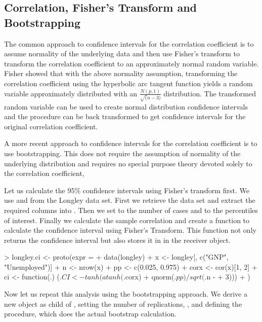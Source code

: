 \documentclass{Z}
\begin{document}
\subsection{Correlation, Fisher's Transform and Bootstrapping}
\label{sec:corr}

The common approach to 
confidence intervals for the correlation coefficient is to
assume normality of the underlying data and then use Fisher's transform
to transform the correlation coefficient to an approximately normal
random variable.
Fisher showed that with the above normality assumption, transforming 
the correlation coefficient using
the hyperbolic arc tangent function
yields a random variable
approximately distributed with an
$\frac{N(p, 1)}{\sqrt(n-3)}$ distribution.  The transformed random
variable can be used to create normal distribution confidence intervals
and the procedure can be back transformed to get confidence intervals
for the original correlation coefficient.

A more recent approach to confidence intervals for the correlation
coefficient is to use bootstrapping.  This does not require the
assumption of normality of the underlying distribution and requires
no special purpose theory devoted solely to the correlation coefficient,

Let us calculate the 95\% 
confidence intervals using Fisher's transform
first.  We use  and  from the Longley data
set.  First we retrieve the data set and extract the required columns
into .  Then we set  to the number of cases
and  to the percentiles
of interest.  Finally we calculate the sample correlation and
create a function to calculate the confidence interval using 
Fisher's Transform.  This function not only returns the confidence
interval but also stores it in  in the receiver object.

\begin{Schunk}
\begin{Sinput}
> longley.ci <- proto(expr = {
+     data(longley)
+     x <- longley[, c("GNP", "Unemployed")]
+     n <- nrow(x)
+     pp <- c(0.025, 0.975)
+     corx <- cor(x)[1, 2]
+     ci <- function(.) (.$CI <- tanh(atanh(.$corx) + qnorm(.$pp)/sqrt(.$n - 
+         3)))
+ })
\end{Sinput}
\end{Schunk}

Now let us repeat this analysis using the bootstrapping approach.  We
derive a new object  as child of
, setting the number of replications, , and
defining the procedure,  which does the actual bootstrap
calculation.
\end{document}
